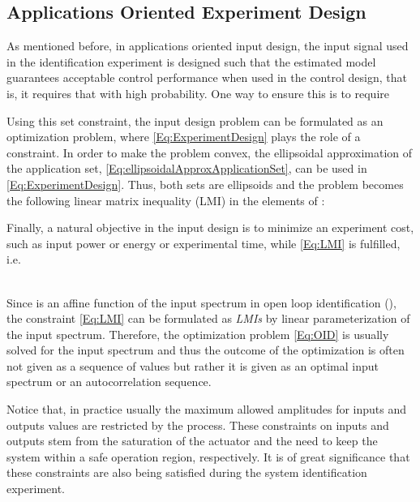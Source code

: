 \documentclass{ifacconf}
\begin{document}
\subsection{Applications Oriented Experiment Design}
As mentioned before, in applications oriented input design, the input signal used in the identification experiment is designed such that the estimated model guarantees acceptable control performance when used in the control design, that is, it requires that   with high probability. One way to ensure this is to require

Using this set constraint, the input design problem can be formulated as an optimization problem, where \eqref{Eq:ExperimentDesign} plays the role of a constraint. In order to make the problem convex, the ellipsoidal approximation of the application set, \eqref{Eq:ellipsoidalApproxApplicationSet}, can be used in \eqref{Eq:ExperimentDesign}. Thus, both sets are ellipsoids and the problem becomes the following linear matrix inequality (LMI) in the elements of :

Finally, a natural objective in the input design is to minimize an experiment cost, such as input power or energy or experimental time, while \eqref{Eq:LMI} is fulfilled, i.e.
\vspace{-0.4cm}

\\
Since  is an affine function of the input spectrum in open loop identification (\cite{L.Ljung1999}), the constraint \eqref{Eq:LMI} can be formulated as \emph{LMIs} by linear parameterization of the input spectrum. Therefore, the optimization problem \eqref{Eq:OID} is usually solved for the input spectrum and thus the outcome of the optimization is often not given as a sequence of values but rather it is given as an optimal input spectrum or an autocorrelation sequence. 


Notice that, in practice usually the maximum allowed amplitudes for inputs and outputs values are restricted by the process. These constraints on inputs and outputs stem from the saturation of the actuator and the need to keep the system within a safe operation region, respectively. It is of great significance that these constraints are also being satisfied during the system identification experiment.
\end{document}
